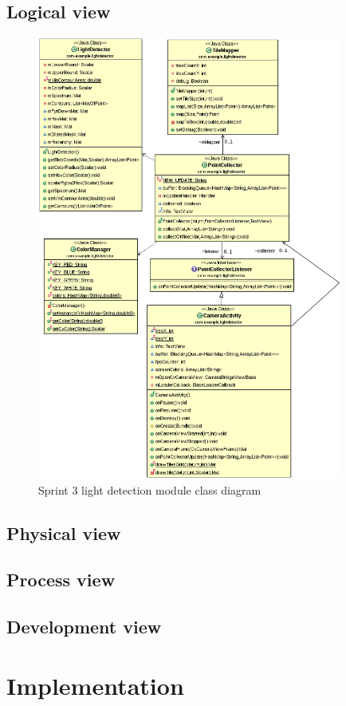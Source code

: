 \subsection{Logical view}

\begin{figure}[H]
	\centering
		\includegraphics[width=10cm]{sprint3/sprint3.png}
	\caption{Sprint 3 light detection module class diagram}
	\label{fig:class_diagram_sprint3}
\end{figure}

\subsection{Physical view}
\subsection{Process view}
\subsection{Development view}

\section{Implementation}


